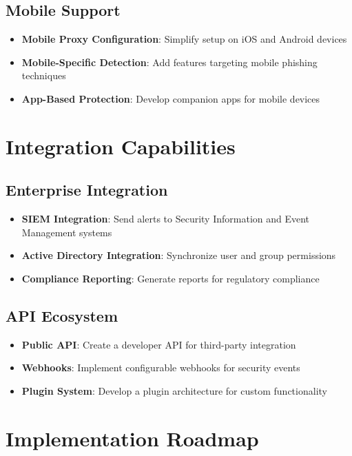 \subsection{Mobile Support}
\begin{itemize}
    \item \textbf{Mobile Proxy Configuration}: Simplify setup on iOS and Android devices
    \item \textbf{Mobile-Specific Detection}: Add features targeting mobile phishing techniques
    \item \textbf{App-Based Protection}: Develop companion apps for mobile devices
\end{itemize}

\section{Integration Capabilities}

\subsection{Enterprise Integration}
\begin{itemize}
    \item \textbf{SIEM Integration}: Send alerts to Security Information and Event Management systems
    \item \textbf{Active Directory Integration}: Synchronize user and group permissions
    \item \textbf{Compliance Reporting}: Generate reports for regulatory compliance
\end{itemize}

\subsection{API Ecosystem}
\begin{itemize}
    \item \textbf{Public API}: Create a developer API for third-party integration
    \item \textbf{Webhooks}: Implement configurable webhooks for security events
    \item \textbf{Plugin System}: Develop a plugin architecture for custom functionality
\end{itemize}

\section{Implementation Roadmap}

